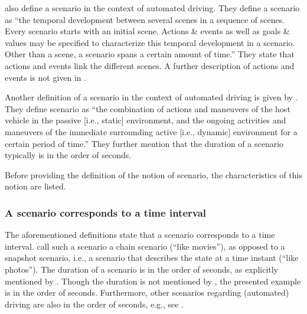 \textcite{ulbrich2015} also define a scenario in the context of automated driving. They define a scenario as ``the temporal development between several scenes in a sequence of scenes. Every scenario starts with an initial scene. Actions \& events as well as goals \& values may be specified to characterize this temporal development in a scenario. Other than a scene, a scenario spans a certain amount of time.'' They state that actions and events link the different scenes. A further description of actions and events is not given in \cite{ulbrich2015}.

Another definition of a scenario in the context of automated driving is given by \textcite{elrofai2016scenario}. They define scenario as ``the combination of actions and maneuvers of the host vehicle in the passive [i.e., static] environment, and the ongoing activities and maneuvers of the immediate surrounding active [i.e., dynamic] environment for a certain period of time.'' They further mention that the duration of a scenario typically is in the order of seconds.

Before providing the definition of the notion of scenario, the characteristics of this notion are listed.

\subsubsection{A scenario corresponds to a time interval}
The aforementioned definitions \cite{go2004blind, geyer2014, ulbrich2015, elrofai2016scenario} state that a scenario corresponds to a time interval. \textcite{vannotten2003updated} call such a scenario a chain scenario (``like movies''), as opposed to a snapshot scenario, i.e., a scenario that describes the state at a time instant (``like photos''). The duration of a scenario is in the order of seconds, as explicitly mentioned by \textcite{elrofai2016scenario}. Though the duration is not mentioned by \textcite{ulbrich2015}, the presented example is in the order of seconds. Furthermore, other scenarios regarding (automated) driving are also in the order of seconds, e.g., see \cite{gietelink2006development, zofka2015datadrivetrafficscenarios, roesener2017comprehensive, karaduman2013interactivebehavior, hulshof2013autonomous, englund2016grand}.

